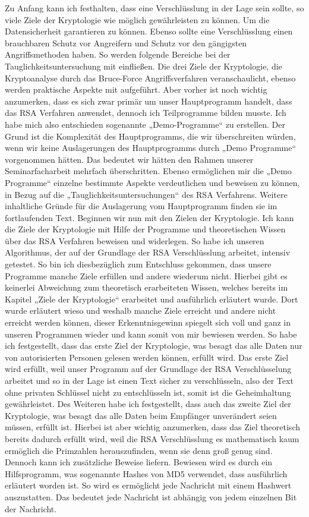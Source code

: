Zu Anfang kann ich festhalten, dass eine Verschlüsslung in der Lage sein sollte, so viele Ziele der Kryptologie wie möglich gewährleisten zu können. Um die Datensicherheit garantieren zu können. Ebenso sollte eine Verschlüsslung einen brauchbaren Schutz vor Angreifern und Schutz vor den gängigsten Angriffsmethoden haben. So werden folgende Bereiche bei der Tauglichkeitsuntersuchung mit einfließen. Die drei Ziele der Kryptologie, die Kryptoanalyse durch das Bruce-Force Angriffsverfahren veranschaulicht, ebenso werden praktische Aspekte mit aufgeführt. Aber vorher ist noch wichtig anzumerken, dass es sich zwar primär um unser Hauptprogramm handelt, dass das RSA Verfahren anwendet, dennoch ich Teilprogramme bilden musste. Ich habe mich also entschieden sogenannte „Demo-Programme“ zu erstellen. Der Grund ist die Komplexität des Hauptprogramms, die wir überschreiten würden, wenn wir keine Auslagerungen des Hauptprogramms durch „Demo Programme“ vorgenommen hätten. Das bedeutet wir hätten den Rahmen unserer Seminarfacharbeit mehrfach überschritten. Ebenso ermöglichen mir die „Demo Programme“ einzelne bestimmte Aspekte verdeutlichen und beweisen zu können, in Bezug auf die „Tauglichkeitsuntersuchungen“ des RSA Verfahrens. Weitere inhaltliche Gründe für die Auslagerung vom Hauptprogramm finden sie im fortlaufenden Text. Beginnen wir nun mit den Zielen der Kryptologie. Ich kann die Ziele der Kryptologie mit Hilfe der Programme und theoretischen Wissen über das RSA Verfahren beweisen und widerlegen. So habe ich unseren Algorithmus, der auf der Grundlage der RSA Verschlüsslung arbeitet, intensiv getestet. So bin ich diesbezüglich zum Entschluss gekommen, dass unsere Programme manche Ziele erfüllen und andere wiederum nicht. Hierbei gibt es keinerlei Abweichung zum theoretisch erarbeiteten Wissen, welches bereits im Kapitel „Ziele der Kryptologie“ erarbeitet und ausführlich erläutert wurde. Dort wurde erläutert wieso und weshalb manche Ziele erreicht und andere nicht erreicht werden können, dieser Erkenntnisgewinn spiegelt sich voll und ganz in unseren Programmen wieder und kann somit von mir bewiesen werden. So habe ich festgestellt, dass das erste Ziel der Kryptologie, was besagt das alle Daten nur von autorisierten Personen gelesen werden können, erfüllt wird. Das erste Ziel wird erfüllt, weil unser Programm auf der Grundlage der RSA Verschlüsselung arbeitet und so in der Lage ist einen Text sicher zu verschlüsseln, also der Text ohne privaten Schlüssel nicht zu entschlüsseln ist, somit ist die Geheimhaltung gewährleistet. Des Weiteren habe ich festgestellt, dass auch das zweite Ziel der Kryptologie, was besagt das alle Daten beim Empfänger unverändert seien müssen, erfüllt ist. Hierbei ist aber wichtig anzumerken, dass das Ziel theoretisch bereits dadurch erfüllt wird, weil die RSA Verschlüsslung es mathematisch kaum ermöglich die Primzahlen herauszufinden, wenn sie denn groß genug sind. Dennoch kann ich zusätzliche Beweise liefern. Bewiesen wird es durch ein Hilfsprogramm, was sogenannte Hashes von MD5 verwendet, dass ausführlich erläutert worden ist. So wird es ermöglicht jede Nachricht mit einem Hashwert auszustatten. Das bedeutet jede Nachricht ist abhängig von jedem einzelnen Bit der Nachricht. \\
